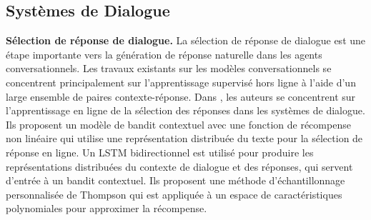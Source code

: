 \documentclass[conference]{IEEEtran}
\newcommand{\1}[1]{\mathbbm{1}_{\left\{#1\right\}}}
\begin{document}

\subsection{Systèmes de Dialogue}
\textbf {Sélection de réponse de dialogue.} La sélection de réponse de dialogue est une étape importante vers la génération de réponse naturelle dans les agents conversationnels. Les travaux existants sur les modèles conversationnels se concentrent principalement sur l'apprentissage supervisé hors ligne à l'aide d'un large ensemble de paires contexte-réponse. Dans \cite{LiuYLM18}, les auteurs se concentrent sur l'apprentissage en ligne de la sélection des réponses dans les systèmes de dialogue. Ils proposent un modèle de bandit contextuel avec une fonction de récompense non linéaire qui utilise une représentation distribuée du texte pour la sélection de réponse en ligne. Un LSTM bidirectionnel est utilisé pour produire les représentations distribuées du contexte de dialogue et des réponses, qui servent d'entrée à un bandit contextuel. Ils proposent une méthode d'échantillonnage personnalisée de Thompson qui est appliquée à un espace de caractéristiques polynomiales pour approximer la récompense.
\end{document}
